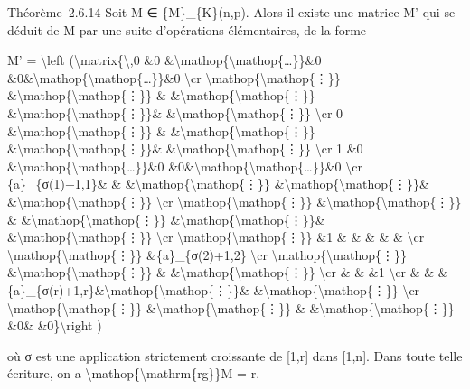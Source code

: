 \documentclass[]{article}
\begin{document}
Théorème~2.6.14 Soit M ∈ \{M\}\_\{K\}(n,p). Alors il existe une matrice
M' qui se déduit de M par une suite d'opérations élémentaires, de la
forme

M' = \textbackslash{}left (\textbackslash{}matrix\{\textbackslash{},0
\&0 \&\textbackslash{}mathop\{\textbackslash{}mathop\{\ldots{}\}\}\&0
\&0\&\textbackslash{}mathop\{\textbackslash{}mathop\{\ldots{}\}\}\&0
\textbackslash{}cr \textbackslash{}mathop\{\textbackslash{}mathop\{⋮\}\}
\&\textbackslash{}mathop\{\textbackslash{}mathop\{⋮\}\} \&
\&\textbackslash{}mathop\{\textbackslash{}mathop\{⋮\}\}
\&\textbackslash{}mathop\{\textbackslash{}mathop\{⋮\}\}\&
\&\textbackslash{}mathop\{\textbackslash{}mathop\{⋮\}\}
\textbackslash{}cr 0
\&\textbackslash{}mathop\{\textbackslash{}mathop\{⋮\}\} \&
\&\textbackslash{}mathop\{\textbackslash{}mathop\{⋮\}\}
\&\textbackslash{}mathop\{\textbackslash{}mathop\{⋮\}\}\&
\&\textbackslash{}mathop\{\textbackslash{}mathop\{⋮\}\}
\textbackslash{}cr 1 \&0
\&\textbackslash{}mathop\{\textbackslash{}mathop\{\ldots{}\}\}\&0
\&0\&\textbackslash{}mathop\{\textbackslash{}mathop\{\ldots{}\}\}\&0
\textbackslash{}cr \{a\}\_\{σ(1)+1,1\}\& \&
\&\textbackslash{}mathop\{\textbackslash{}mathop\{⋮\}\}
\&\textbackslash{}mathop\{\textbackslash{}mathop\{⋮\}\}\&
\&\textbackslash{}mathop\{\textbackslash{}mathop\{⋮\}\}
\textbackslash{}cr \textbackslash{}mathop\{\textbackslash{}mathop\{⋮\}\}
\&\textbackslash{}mathop\{\textbackslash{}mathop\{⋮\}\} \&
\&\textbackslash{}mathop\{\textbackslash{}mathop\{⋮\}\}
\&\textbackslash{}mathop\{\textbackslash{}mathop\{⋮\}\}\&
\&\textbackslash{}mathop\{\textbackslash{}mathop\{⋮\}\}
\textbackslash{}cr \textbackslash{}mathop\{\textbackslash{}mathop\{⋮\}\}
\&1 \& \& \& \& \& \textbackslash{}cr
\textbackslash{}mathop\{\textbackslash{}mathop\{⋮\}\}
\&\{a\}\_\{σ(2)+1,2\} \textbackslash{}cr
\textbackslash{}mathop\{\textbackslash{}mathop\{⋮\}\}
\&\textbackslash{}mathop\{\textbackslash{}mathop\{⋮\}\} \&
\&\textbackslash{}mathop\{\textbackslash{}mathop\{⋮\}\}
\textbackslash{}cr \& \& \&1 \textbackslash{}cr \& \&
\&\{a\}\_\{σ(r)+1,r\}\&\textbackslash{}mathop\{\textbackslash{}mathop\{⋮\}\}\&
\&\textbackslash{}mathop\{\textbackslash{}mathop\{⋮\}\}
\textbackslash{}cr \textbackslash{}mathop\{\textbackslash{}mathop\{⋮\}\}
\&\textbackslash{}mathop\{\textbackslash{}mathop\{⋮\}\} \&
\&\textbackslash{}mathop\{\textbackslash{}mathop\{⋮\}\} \&0\&
\&0\}\textbackslash{}right )

où σ est une application strictement croissante de {[}1,r{]} dans
{[}1,n{]}. Dans toute telle écriture, on a
\textbackslash{}mathop\{\textbackslash{}mathrm\{rg\}\}M = r.
\end{document}
